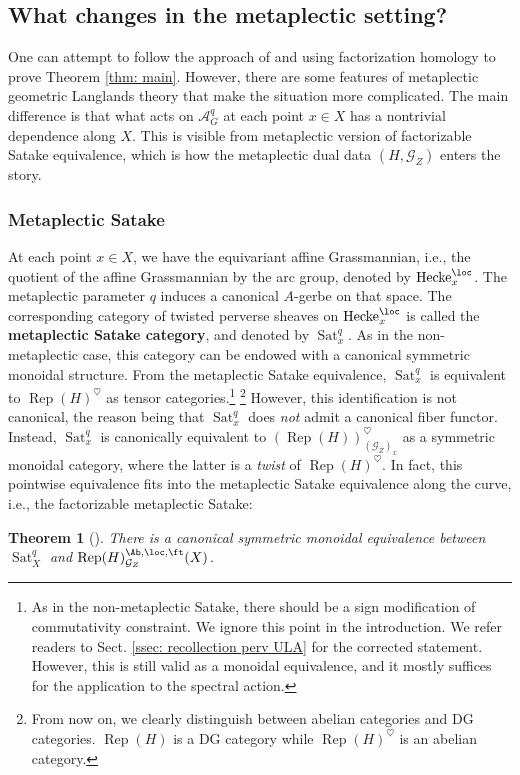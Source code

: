 \documentclass[10pt]{amsart}
\newcommand{\sssec}{\subsubsection}
\newtheorem{thm}[subsubsection]{Theorem}
\theoremstyle{remark}
\newcommand{\on}{\operatorname}
\newcommand{\cA}{\mathcal{A}}
\newcommand{\cG}{\mathcal{G}}
\newcommand{\Rep}{\on{Rep}}
\newcommand{\Sat}{\on{Sat}}
\newcommand{\Hecke}{\on{Hecke}}
\begin{document}
\subsection{What changes in the metaplectic setting?}
One can attempt to follow the approach of \cite{NY} and \cite{GKRV} using factorization homology to prove Theorem \ref{thm: main}. However, there are some features of metaplectic geometric Langlands theory that make the situation more complicated. The main difference is that what acts on $\cA^q_G$ at each point $x\in X$ has a nontrivial dependence along $X$. This is visible from metaplectic version of factorizable Satake equivalence, which is how the metaplectic dual data $(H,\cG_Z)$ enters the story. 

\sssec{Metaplectic Satake}
At each point $x\in X$, we have the equivariant affine Grassmannian, i.e., the quotient of the affine Grassmannian by the arc group, denoted by $\Hecke^{\loc}_x$. The metaplectic parameter $q$ induces a canonical $A$-gerbe on that space. The corresponding category of twisted perverse sheaves on $\Hecke^{\loc}_x$ is called the \textbf{metaplectic Satake category}, and denoted by $\Sat^q_x$. As in the non-metaplectic case, this category can be endowed with a canonical symmetric monoidal structure. From the metaplectic Satake equivalence, $\Sat^q_x$ is equivalent to $\Rep(H)^{\heartsuit}$ as tensor categories.\footnote{As in the non-metaplectic Satake, there should be a sign modification of commutativity constraint. We ignore this point in the introduction. We refer readers to Sect. \ref{ssec: recollection perv ULA} for the corrected statement. However, this is still valid  as a monoidal equivalence, and it mostly suffices for the application to the spectral action.} \footnote{From now on, we clearly distinguish between abelian categories and DG categories. $\Rep(H)$ is a DG category while $\Rep(H)^{\heartsuit}$ is an abelian category.} However, this identification is not canonical, the reason being that $\Sat^q_x$ does \emph{not} admit a canonical fiber functor. Instead, $\Sat^q_x$ is canonically equivalent to $(\Rep(H))^{\heartsuit}_{(\cG_{Z})_x}$ as a symmetric monoidal category, where the latter is a \emph{twist} of $\Rep(H)^{\heartsuit}$. In fact, this pointwise equivalence fits into the metaplectic Satake equivalence along the curve, i.e., the factorizable metaplectic Satake:

\begin{thm}[\cite{Rei, ZhaoNew}]\label{thm: abelian Satake light}
    There is a canonical symmetric monoidal equivalence   between $\Sat^q_{X}$ and $\Rep(H)^{\Ab,\loc,\ft}_{\cG_Z}(X)$. 
\end{thm}
\end{document}

